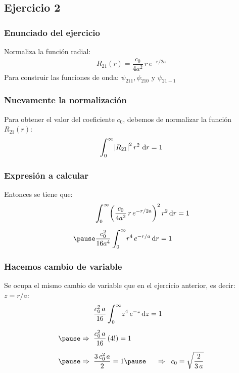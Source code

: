 \documentclass[12pt]{beamer}
\begin{document}
\subsection{Ejercicio 2}

\begin{frame}
\frametitle{Enunciado del ejercicio}
Normaliza la función radial:
\pause
\begin{align*}
R_{21} (r) = \dfrac{c_{0}}{4 a^{2}} \, r \, e^{-r/2a}
\end{align*}
\pause
Para construir las funciones de onda: $\psi_{211}, \psi_{210}$ y $\psi_{21-1}$
\end{frame}
\begin{frame}
\frametitle{Nuevamente la normalización}
Para obtener el valor del coeficiente $c_{0}$, debemos de normalizar la función $R_{21} (r)$:
\pause
\begin{align*}
\scaleint{6ex}_{\bs 0}^{\infty} \abs{R_{21}}^{2} \, r^{2} \, \dd{r} = 1
\end{align*}
\end{frame}
\begin{frame}
\frametitle{Expresión a calcular}
Entonces se tiene que:
\pause
\begin{eqnarray*}
\begin{aligned}
&\scaleint{6ex}_{\bs 0}^{\infty} \bigg( \dfrac{c_{0}}{4 a^{2}} \, r \, e^{-r/2a} \bigg)^{2} \, r^{2} \dd{r} = 1 \\[0.5em] \pause
&\dfrac{c_{0}^{2}}{16 a^{4}} \, \scaleint{6ex}_{\bs 0}^{\infty}  r^{4} \, e^{-r/a} \dd{r} = 1
\end{aligned}
\end{eqnarray*}
\end{frame}
\begin{frame}
\frametitle{Hacemos cambio de variable}
Se ocupa el mismo cambio de variable que en el ejercicio anterior, es decir: $z = r/a$:
\pause
\begin{eqnarray*}
\begin{aligned}
&\dfrac{c_{0}^{2} \, a}{16} \, \scaleint{6ex}_{\bs 0}^{\infty}  z^{4} \, e^{-z} \dd{z} = 1 \\[0.5em] \pause
\Rightarrow \hspace{0.2cm} &\dfrac{c_{0}^{2} \, a}{16} \, (4!) = 1 \\[0.5em] \pause
\Rightarrow \hspace{0.2cm} &\dfrac{3 \, c_{0}^{2} \, a}{2} = 1 \pause \hspace{0.5cm} \Rightarrow \hspace{0.2cm} c_{0} = \sqrt{\dfrac{2}{3 \, a}}
\end{aligned}
\end{eqnarray*}
\end{frame}
\end{document}
